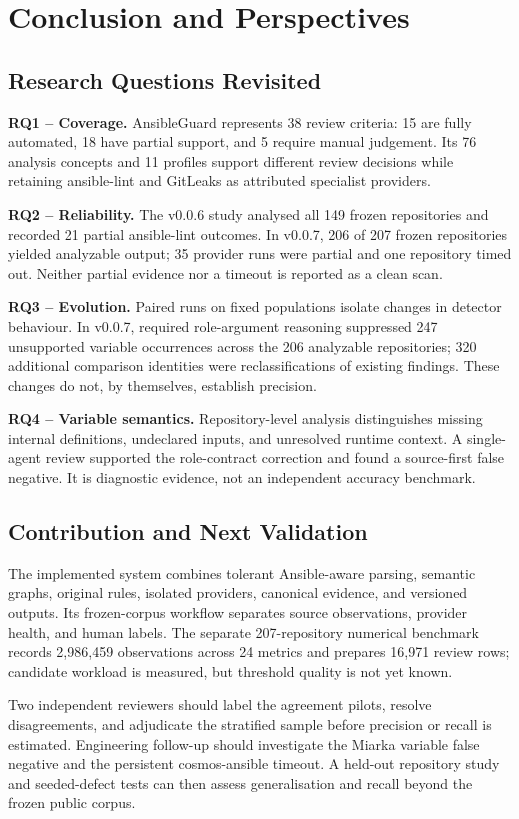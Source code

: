 \chapter{Conclusion and Perspectives}
\label{chap:conclusion}

\section{Research Questions Revisited}
\textbf{RQ1 -- Coverage.} AnsibleGuard represents 38 review criteria: 15 are
fully automated, 18 have partial support, and 5 require manual judgement. Its
76 analysis concepts and 11 profiles support different review decisions while
retaining ansible-lint and GitLeaks as attributed specialist providers.

\textbf{RQ2 -- Reliability.} The v0.0.6 study analysed all 149 frozen
repositories and recorded 21 partial ansible-lint outcomes. In v0.0.7, 206
of 207 frozen repositories yielded analyzable output; 35 provider runs were
partial and one repository timed out. Neither partial evidence nor a timeout
is reported as a clean scan.

\textbf{RQ3 -- Evolution.} Paired runs on fixed populations isolate changes
in detector behaviour. In v0.0.7, required role-argument reasoning suppressed
247 unsupported variable occurrences across the 206 analyzable repositories;
320 additional comparison identities were reclassifications of existing
findings. These changes do not, by themselves, establish precision.

\textbf{RQ4 -- Variable semantics.} Repository-level analysis distinguishes
missing internal definitions, undeclared inputs, and unresolved runtime
context. A single-agent review supported the role-contract correction and
found a source-first false negative. It is diagnostic evidence, not an
independent accuracy benchmark.

\section{Contribution and Next Validation}
The implemented system combines tolerant Ansible-aware parsing, semantic
graphs, original rules, isolated providers, canonical evidence, and versioned
outputs. Its frozen-corpus workflow separates source observations, provider
health, and human labels. The separate 207-repository numerical benchmark
records 2,986,459 observations across 24 metrics and prepares 16,971 review
rows; candidate workload is measured, but threshold quality is not yet known.

Two independent reviewers should label the agreement pilots, resolve
disagreements, and adjudicate the stratified sample before precision or recall
is estimated. Engineering follow-up should investigate the Miarka variable
false negative and the persistent cosmos-ansible timeout. A held-out
repository study and seeded-defect tests can then assess generalisation and
recall beyond the frozen public corpus.
